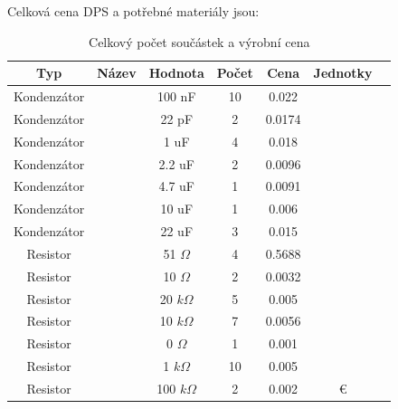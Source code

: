 Celková cena DPS a potřebné materiály jsou:
\begin{table}[H]
    \label{tab:bom}
    \caption{Celkový počet součástek a výrobní cena }
    \hspace*{-1.55cm}
    \begin{ctucolortab}
        \begin{tabular}{ccccccc}
            \toprule
            Typ                   & Název                  & Hodnota       & Počet & Cena     & Jednotky & \\ \midrule
            Kondenzátor           &                        & 100 nF        & 10    & 0.022    &          & \\
            Kondenzátor           &                        & 22 pF         & 2     & 0.0174   &          & \\
            Kondenzátor           &                        & 1 uF          & 4     & 0.018    &          & \\
            Kondenzátor           &                        & 2.2 uF        & 2     & 0.0096   &          & \\
            Kondenzátor           &                        & 4.7 uF        & 1     & 0.0091   &          & \\
            Kondenzátor           &                        & 10 uF         & 1     & 0.006    &          & \\
            Kondenzátor           &                        & 22 uF         & 3     & 0.015    &          & \\
            Resistor              &                        & 51 $\Omega$   & 4     & 0.5688   &          & \\
            Resistor              &                        & 10 $\Omega$   & 2     & 0.0032   &          & \\
            Resistor              &                        & 20 $k\Omega$  & 5     & 0.005    &          & \\
            Resistor              &                        & 10 $k\Omega$  & 7     & 0.0056   &          & \\
            Resistor              &                        & 0 $\Omega$    & 1     & 0.001    &          & \\
            Resistor              &                        & 1 $k\Omega$   & 10    & 0.005    &          & \\
            Resistor              &                        & 100 $k\Omega$ & 2     & 0.002    & €        & \\

\end{tabular}
\end{ctucolortab}
\end{table}
